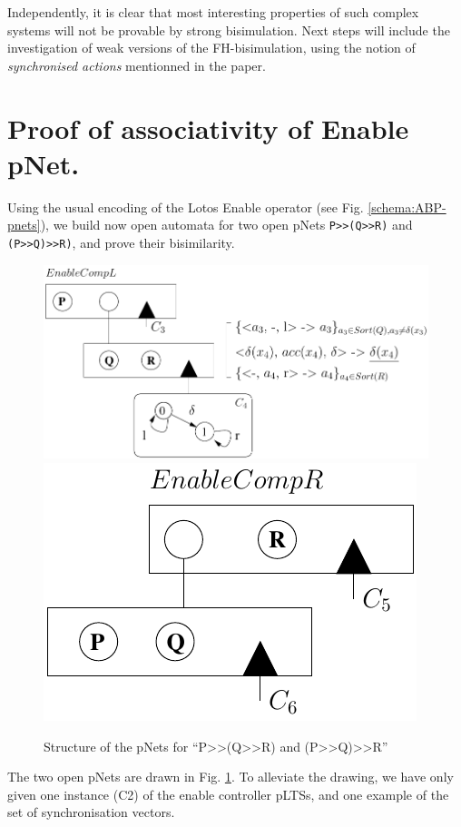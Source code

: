 \documentclass{lncs/llncs}
\begin{document}
Independently, it is clear that most interesting properties of
such complex systems will not be provable by strong bisimulation.
Next steps will include the investigation of weak
versions of the FH-bisimulation, using the notion of
\emph{synchronised actions} mentionned in the paper.



% 


\newpage
\appendix

\section{Proof of associativity of Enable pNet.}
\label{appendix:assoc}

Using the usual encoding of the Lotos Enable operator (see
Fig. \ref{schema:ABP-pnets}), we build now open automata for two  
open pNets \texttt{P>>(Q>>R)} and \texttt{(P>>Q)>>R)}, and 
prove their bisimilarity.
\begin{figure}[t]
\centerline{ %
  \includegraphics[width=0.60\linewidth]{XFIG/P-QR}
  \hspace{5mm}
 \includegraphics[width=0.27\linewidth]{XFIG/PQ-R}}
  \caption{Structure of the pNets for ``P>>(Q>>R) and (P>>Q)>>R''}
  \label{schema:enable-assoc}
\end{figure}

The two open pNets are drawn in Fig. \ref{schema:enable-assoc}. To
alleviate the drawing, we have only 
  given one instance (C2) of the enable controller pLTSs, and one example of
  the set of synchronisation vectors.
\end{document}
